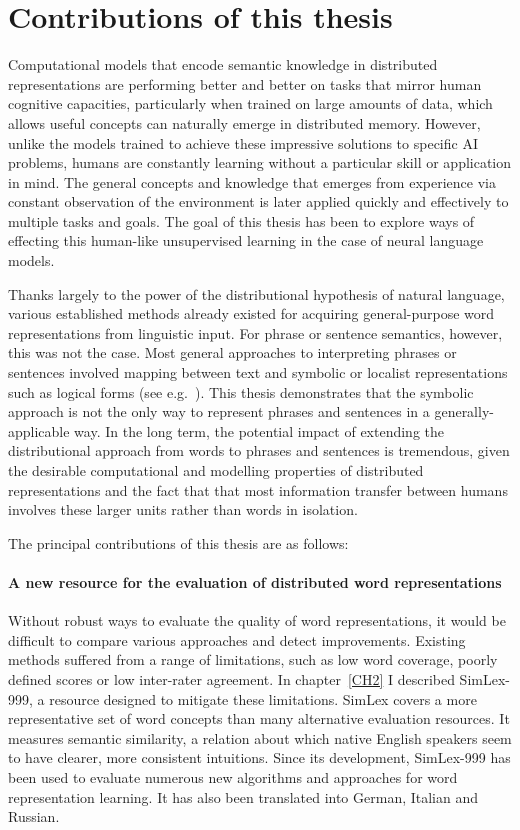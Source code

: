 
\section{Contributions of this thesis}

Computational models that encode semantic knowledge in distributed representations are performing better and better on tasks that mirror human cognitive capacities, particularly when trained on large amounts of data, which allows useful concepts can naturally emerge in distributed memory. However, unlike the models trained to achieve these impressive solutions to specific AI problems, humans are constantly learning without a particular skill or application in mind. The general concepts and knowledge that emerges from experience via constant observation of the environment is later applied quickly and effectively to multiple tasks and goals. The goal of this thesis has been to explore ways of effecting this human-like unsupervised learning in the case of neural language models.

Thanks largely to the power of the distributional hypothesis of natural language, various established methods already existed for acquiring general-purpose word representations from linguistic input. For phrase or sentence semantics, however, this was not the case. Most general approaches to interpreting phrases or sentences involved mapping between text and symbolic or localist representations such as logical forms (see e.g.~\citealt{poon2009unsupervised}). This thesis demonstrates that the symbolic approach is not the only way to represent phrases and sentences in a generally-applicable way. In the long term, the potential impact of extending the distributional approach from words to phrases and sentences is tremendous, given the desirable computational and modelling properties of distributed representations and the fact that that most information transfer between humans involves these larger units rather than words in isolation. 

The principal contributions of this thesis are as follows:

\paragraph{A new resource for the evaluation of distributed word representations} Without robust ways to evaluate the quality of word representations, it would be difficult to compare various approaches and detect improvements. Existing methods suffered from a range of limitations, such as low word coverage, poorly defined scores or low inter-rater agreement. In chapter~\ref{CH2} I described SimLex-999, a resource designed to mitigate these limitations. SimLex covers a more representative set of word concepts than many alternative evaluation resources. It measures semantic similarity, a relation about which native English speakers seem to have clearer, more consistent intuitions. Since its development, SimLex-999 has been used to evaluate numerous new algorithms and approaches for word representation learning. It has also been translated into German, Italian and Russian. 

